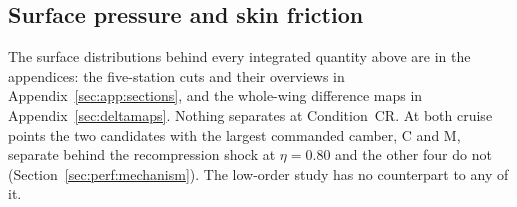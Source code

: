 \subsection{Surface pressure and skin friction}
\label{sec:results:surface}

The surface distributions behind every integrated quantity above are in the appendices: the
five-station cuts and their overviews in Appendix~\ref{sec:app:sections}, and the whole-wing
difference maps in Appendix~\ref{sec:deltamaps}. Nothing separates at Condition~CR. At both
cruise points the two candidates with the largest commanded camber, C and M, separate behind the
recompression shock at $\eta = 0.80$ and the other four do not (Section~\ref{sec:perf:mechanism}).
The low-order study has no counterpart to any of it.
